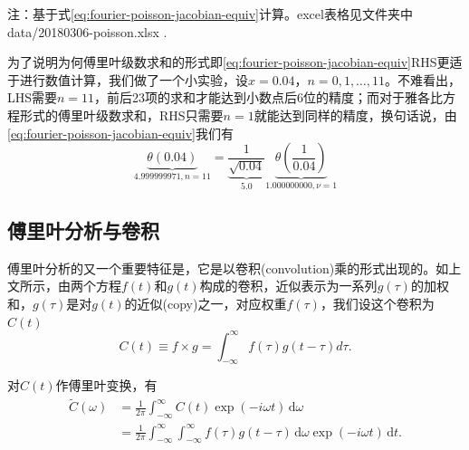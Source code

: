 \begin{table}[htbp]
\small{注：基于式\eqref{eq:fourier-poisson-jacobian-equiv}计算。excel表格见文件夹中data/20180306-poisson.xlsx .}
\end{table}%

为了说明为何傅里叶级数求和的形式即\eqref{eq:fourier-poisson-jacobian-equiv}RHS更适于进行数值计算，我们做了一个小实验，设$x=0.04$，$n=0,1,\ldots,11$。不难看出，LHS需要$n=11$，前后23项的求和才能达到小数点后6位的精度；而对于雅各比方程形式的傅里叶级数求和，RHS只需要$n=1$就能达到同样的精度，换句话说，由\eqref{eq:fourier-poisson-jacobian-equiv}我们有
\begin{equation*}
\underbrace{
\theta \left( 0.04 \right)
}_{4.999999971, n=11}
=
\underbrace{
\frac{1}{\sqrt{0.04}}
}_{5.0}
\underbrace{
\theta \left( \frac{1}{0.04} \right)
}_{1.000000000, \nu = 1}
\end{equation*}

\subsection{傅里叶分析与卷积}
\label{sec:fourier-series-convolution}
傅里叶分析的又一个重要特征是，它是以卷积(convolution)乘的形式出现的。如上文所示，由两个方程$f(t)$和$g(t)$构成的卷积，近似表示为一系列$g(\tau)$的加权和，$g(\tau)$是对$g(t)$的近似(copy)之一，对应权重$f(\tau)$，我们设这个卷积为$C(t)$
\begin{equation*}
C(t) \equiv f \times g = \int_{-\infty}^{\infty} f(\tau) g(t - \tau) d \tau.
\end{equation*}

对$C(t)$作傅里叶变换，有
\begin{equation*}
\begin{split}
\widetilde{C}(\omega) & = \frac{1}{2 \pi}
\int_{-\infty}^{\infty} C(t) \exp \left( - i \omega t \right) \, \mathrm{d} \omega  \\
& = \frac{1}{2 \pi} \int_{-\infty}^{\infty}
\int_{-\infty}^{\infty} f(\tau) g(t - \tau)
\, \mathrm{d} \omega
\exp \left( - i \omega t \right)
\, \mathrm{d} t.
\end{split}
\end{equation*}

